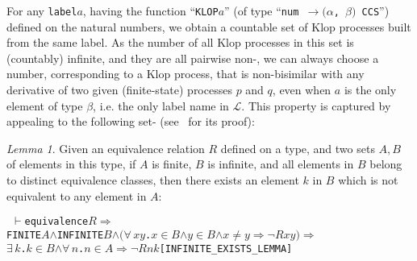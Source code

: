 \documentclass[GCNS]{yincog}
\renewcommand{\HOLinline}[1]{\mbox{\textup{\texttt{#1}}}}
\renewcommand{\HOLConst}[1]{\texttt{#1}}
\renewcommand{\HOLTyOp}[1]{\texttt{#1}}
\renewcommand{\HOLBoundVar}[1]{\ensuremath{\mathit{#1}}}
\renewcommand{\HOLFreeVar}[1]{\ensuremath{\mathit{#1}}}
\renewcommand{\HOLSymConst}[1]{#1}
\renewcommand{\HOLTokenConj}{\ensuremath{\wedge}}
\renewcommand{\HOLTokenIn}{\ensuremath{\in}}
\renewcommand{\HOLTokenNeg}{\ensuremath{\neg}}
\renewcommand{\HOLTokenNotEqual}{\ensuremath{\neq}}
\renewcommand{\HOLTokenExists}{\ensuremath{\exists \,}}
\renewcommand{\HOLTokenForall}{\ensuremath{\forall \,}}
\renewcommand{\HOLTokenTurnstile}{\ensuremath{\:\:\vdash}}
\theoremstyle{remark}
\theoremstyle{theorem}
\newtheorem{lemma}[definition]{Lemma}
\theoremstyle{remark}
\newcommand{\HOLTokenTransEnd}{$\rightarrow$\xspace}
\renewcommand{\HOLTokenImp}{\ensuremath{\Longrightarrow}}
\begin{document}
For any \HOLinline{\HOLConst{label}\;\HOLFreeVar{a}}, having the function
``\HOLinline{\HOLConst{KLOP}\;\HOLFreeVar{a}}'' (of type ``\HOLinline{\HOLTyOp{num} \HOLTokenTransEnd \ensuremath{(}\ensuremath{\alpha}, \ensuremath{\beta}\ensuremath{)} \HOLTyOp{CCS}}'')
defined on the natural numbers, we obtain a countable set of Klop processes
built from the same label. As the number of all Klop processes in this
set is (countably) infinite, and they are all pairwise non-, we
can always choose a number, corresponding to a Klop process, that is non-bisimilar
with any derivative of two given (finite-state) processes $p$ and
$q$, even when $a$ is the only element of type $\beta $, i.e. the only
label name in $\mathscr{L}$. This property is captured by appealing to
the following set-  (see~\cite{Tian:2017wrba} for its proof):
%
\begin{lemma}
Given an equivalence relation $R$ defined on a type, and two sets
$A, B$ of elements in this type, if $A$ is finite, $B$ is infinite, and
all elements in $B$ belong to distinct equivalence classes, then there
exists an element $k$ in $B$ which is not equivalent to any element in
$A$:
%
\begin{alltt}
\HOLTokenTurnstile{} \HOLConst{equivalence} \HOLFreeVar{R} \HOLSymConst{\HOLTokenImp{}}
   \HOLConst{FINITE} \HOLFreeVar{A} \HOLSymConst{\HOLTokenConj{}} \HOLConst{INFINITE} \HOLFreeVar{B} \HOLSymConst{\HOLTokenConj{}} \ensuremath{(}\HOLSymConst{\HOLTokenForall{}}\HOLBoundVar{x} \HOLBoundVar{y}. \HOLBoundVar{x} \HOLSymConst{\HOLTokenIn{}} \HOLFreeVar{B} \HOLSymConst{\HOLTokenConj{}} \HOLBoundVar{y} \HOLSymConst{\HOLTokenIn{}} \HOLFreeVar{B} \HOLSymConst{\HOLTokenConj{}} \HOLBoundVar{x} \HOLSymConst{\HOLTokenNotEqual{}} \HOLBoundVar{y} \HOLSymConst{\HOLTokenImp{}} \HOLSymConst{\HOLTokenNeg{}}\HOLFreeVar{R} \HOLBoundVar{x} \HOLBoundVar{y}\ensuremath{)} \HOLSymConst{\HOLTokenImp{}}
   \HOLSymConst{\HOLTokenExists{}}\HOLBoundVar{k}. \HOLBoundVar{k} \HOLSymConst{\HOLTokenIn{}} \HOLFreeVar{B} \HOLSymConst{\HOLTokenConj{}} \HOLSymConst{\HOLTokenForall{}}\HOLBoundVar{n}. \HOLBoundVar{n} \HOLSymConst{\HOLTokenIn{}} \HOLFreeVar{A} \HOLSymConst{\HOLTokenImp{}} \HOLSymConst{\HOLTokenNeg{}}\HOLFreeVar{R} \HOLBoundVar{n} \HOLBoundVar{k}\hfill[INFINITE\_EXISTS\_LEMMA]
\end{alltt}
%
\end{lemma}
\end{document}
